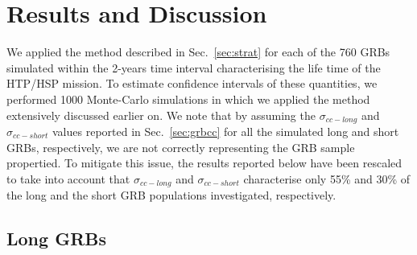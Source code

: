 \documentclass[]{spie}  %
\begin{document}
\section{Results and Discussion}

We applied the method described in Sec.~\ref{sec:strat} for each of the 760 GRBs simulated within the 2-years time interval characterising the life time of the HTP/HSP mission. To estimate confidence intervals of these quantities, we performed 1000 Monte-Carlo simulations in which we applied the method extensively discussed earlier on. We note that by assuming the $\sigma_{cc-long}$ and $\sigma_{cc-short}$ values reported in Sec.~\ref{sec:grbcc} for all the simulated long and short GRBs, respectively, we are not correctly representing the GRB sample propertied. To mitigate this issue, the results reported below have been rescaled to take into account that $\sigma_{cc-long}$ and $\sigma_{cc-short}$ characterise only 55\% and 30\% of the long and the short GRB populations investigated, respectively.



\subsection{Long GRBs}
\end{document}
